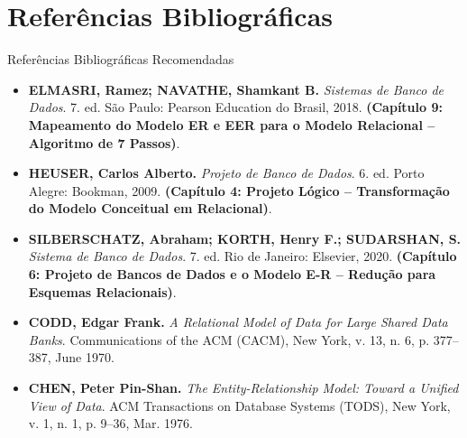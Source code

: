 \section[Referências]{Referências Bibliográficas}

\begin{frame}{Referências Bibliográficas Recomendadas}
  \scriptsize
  \begin{itemize}
    \item \textbf{ELMASRI, Ramez; NAVATHE, Shamkant B.} \textit{Sistemas de Banco de Dados}. 7. ed. São Paulo: Pearson Education do Brasil, 2018. \textbf{(Capítulo 9: Mapeamento do Modelo ER e EER para o Modelo Relacional -- Algoritmo de 7 Passos)}.
    \vspace{0.12cm}
    \item \textbf{HEUSER, Carlos Alberto.} \textit{Projeto de Banco de Dados}. 6. ed. Porto Alegre: Bookman, 2009. \textbf{(Capítulo 4: Projeto Lógico -- Transformação do Modelo Conceitual em Relacional)}.
    \vspace{0.12cm}
    \item \textbf{SILBERSCHATZ, Abraham; KORTH, Henry F.; SUDARSHAN, S.} \textit{Sistema de Banco de Dados}. 7. ed. Rio de Janeiro: Elsevier, 2020. \textbf{(Capítulo 6: Projeto de Bancos de Dados e o Modelo E-R -- Redução para Esquemas Relacionais)}.
    \vspace{0.12cm}
    \item \textbf{CODD, Edgar Frank.} \textit{A Relational Model of Data for Large Shared Data Banks}. Communications of the ACM (CACM), New York, v. 13, n. 6, p. 377--387, June 1970.
    \vspace{0.12cm}
    \item \textbf{CHEN, Peter Pin-Shan.} \textit{The Entity-Relationship Model: Toward a Unified View of Data}. ACM Transactions on Database Systems (TODS), New York, v. 1, n. 1, p. 9--36, Mar. 1976.
  \end{itemize}
\end{frame}
